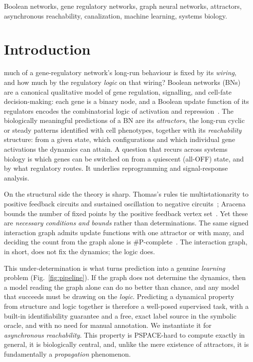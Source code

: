 \documentclass[journal]{IEEEtran}
\begin{document}
\begin{IEEEkeywords}
Boolean networks, gene regulatory networks, graph neural networks, attractors,
asynchronous reachability, canalization, machine learning, systems biology.
\end{IEEEkeywords}

\section{Introduction}
 much of a gene-regulatory network's long-run behaviour is fixed
by its \emph{wiring}, and how much by the regulatory \emph{logic} on that wiring?
Boolean networks (BNs) are a canonical qualitative model of gene regulation,
signalling, and cell-fate decision-making: each gene is a binary node, and a Boolean
update function of its regulators encodes the combinatorial logic of activation and
repression~\cite{kauffman,thomasoriginal}. The biologically meaningful predictions of
a BN are its \emph{attractors}, the long-run cyclic or steady patterns identified
with cell phenotypes, together with its \emph{reachability} structure: from a given
state, which configurations and which individual gene activations the dynamics can
attain. A question that recurs across systems biology is which genes can be switched on
from a quiescent (all-OFF) state, and by what regulatory routes. It underlies
reprogramming and signal-response analysis.

On the structural side the theory is sharp. Thomas's rules tie multistationarity to
positive feedback circuits and sustained oscillation to negative
circuits~\cite{richard2007,thomasreview}; Aracena bounds the number of fixed points by
the positive feedback vertex set~\cite{aracena2008}. Yet these are \emph{necessary
conditions and bounds} rather than determinations. The same signed interaction graph
admits update functions with one attractor or with many, and deciding the count from
the graph alone is \#P-complete~\cite{pcomplete}. The interaction graph, in short, does
not fix the dynamics; the logic does.

This under-determination is what turns prediction into a genuine \emph{learning}
problem (Fig.~\ref{fig:pipeline}). If the graph does not determine the dynamics, then a
model reading the graph alone can do no better than chance, and any model that succeeds
must be drawing on the \emph{logic}. Predicting a dynamical property from structure and
logic together is therefore a well-posed supervised task, with a built-in
identifiability guarantee and a free, exact label source in the symbolic oracle, and
with no need for manual annotation. We instantiate it for \emph{asynchronous
reachability}. This property is PSPACE-hard to compute exactly in general, it is
biologically central, and, unlike the mere existence of attractors, it is fundamentally
a \emph{propagation} phenomenon.
\end{document}
